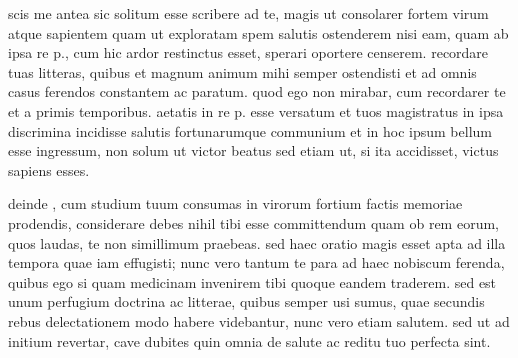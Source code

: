 scis me antea sic solitum esse scribere ad te, magis ut consolarer fortem virum atque sapientem quam ut exploratam spem salutis ostenderem nisi eam, quam ab ipsa re p., cum hic ardor restinctus esset, sperari oportere censerem. recordare tuas litteras, quibus et magnum animum mihi semper ostendisti et ad omnis casus ferendos constantem ac paratum. quod ego non mirabar, cum recordarer te et a primis temporibus. aetatis in re p. esse versatum et tuos magistratus in ipsa discrimina incidisse salutis fortunarumque communium et in hoc ipsum bellum esse ingressum, non solum ut victor beatus sed etiam ut, si ita accidisset, victus sapiens esses.

 deinde , cum studium tuum consumas in virorum fortium factis memoriae prodendis, considerare debes nihil tibi esse committendum quam ob rem eorum, quos laudas, te non simillimum praebeas. sed haec oratio magis esset apta ad illa tempora quae iam effugisti; nunc vero tantum te para ad haec nobiscum ferenda, quibus ego si quam medicinam invenirem tibi quoque eandem traderem. sed est unum perfugium doctrina ac litterae, quibus semper usi sumus, quae secundis rebus delectationem modo habere videbantur, nunc vero etiam salutem. sed ut ad initium revertar, cave dubites quin omnia de salute ac reditu tuo perfecta sint.
